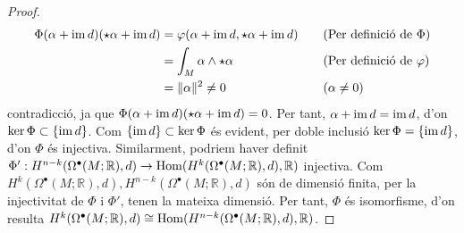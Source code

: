 \begin{teorema}
\begin{proof}
        \begin{align*}
            \Phi(\alpha+\operatorname{im}{d})(\star\alpha+\operatorname{im}{d})
            &=\varphi(\alpha+\operatorname{im}{d},\star\alpha+\operatorname{im}{d})
            &\quad&\textrm{(Per definició de $\Phi$)}\\
            &=\int_{M}\alpha\wedge\star\alpha
            &\quad&\textrm{(Per definició de $\varphi$)}\\
            &=\|\alpha\|^{2}\neq0
            &\quad&\textrm{($\alpha\neq0$)}
        \end{align*}
        contradicció, ja que $\Phi(\alpha+\operatorname{im}{d})(\star\alpha+\operatorname{im}{d})=0$. Per tant, $\alpha+\operatorname{im}{d}=\operatorname{im}{d}$, d'on $\ker{\Phi}\subset\{\operatorname{im}{d}\}$. Com $\{\operatorname{im}{d}\}\subset\ker{\Phi}$ és evident, per doble inclusió $\ker{\Phi}=\{\operatorname{im}{d}\}$, d'on $\Phi$ és injectiva.\newline
        Similarment, podriem haver definit $\Phi':H^{n-k}(\Omega^{\bullet}(M;\mathbb{R}),d)\rightarrow\operatorname{Hom}(H^{k}(\Omega^{\bullet}(M;\mathbb{R}),d),\mathbb{R})$ injectiva. Com $H^{k}(\Omega^{\bullet}(M;\mathbb{R}),d),H^{n-k}(\Omega^{\bullet}(M;\mathbb{R}),d)$ són de dimensió finita, per la injectivitat de $\Phi$ i $\Phi'$, tenen la mateixa dimensió. Per tant, $\Phi$ és isomorfisme, d'on resulta $H^{k}(\Omega^{\bullet}(M;\mathbb{R}),d)\cong\operatorname{Hom}(H^{n-k}(\Omega^{\bullet}(M;\mathbb{R}),d),\mathbb{R})$.
    \end{proof}
\end{teorema}

